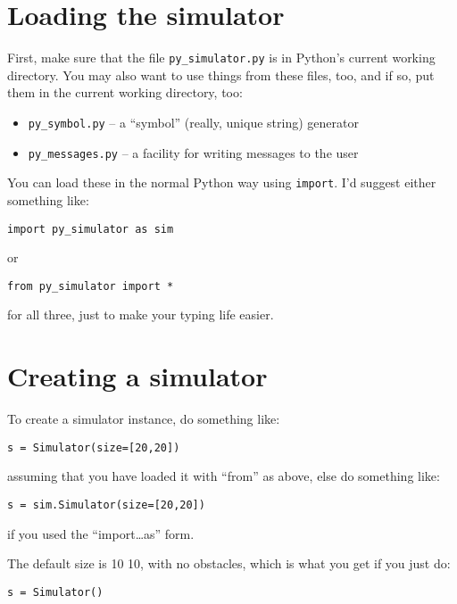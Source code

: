 \documentclass[11pt]{tufte-handout}
\begin{document}

\section{Loading the simulator}
\label{sec:orgf118c0c}

First, make sure that the file \texttt{py\_simulator.py} is in Python's current working directory.  You may also want to use things from these files, too, and if so, put them in the current working directory, too:
\begin{itemize}
\item \texttt{py\_symbol.py} -- a ``symbol'' (really, unique string) generator
\item \texttt{py\_messages.py} -- a facility for writing messages to the user
\end{itemize}

You can load these in the normal Python way using \texttt{import}.  I'd suggest either something like:
\begin{verbatim}
import py_simulator as sim
\end{verbatim}

or
\begin{verbatim}
from py_simulator import *
\end{verbatim}

\noindent for all three, just to make your typing life easier.

\section{Creating a simulator}
\label{sec:org8ddd231}

To create a simulator instance, do something like:
\begin{verbatim}
s = Simulator(size=[20,20])
\end{verbatim}

\noindent assuming that you have loaded it with ``from'' as above, else do something like:
\begin{verbatim}
s = sim.Simulator(size=[20,20])
\end{verbatim}

\noindent if you used the ``import\ldots{}as'' form.

The default size is 10\texttimes{} 10, with no obstacles, which is what you get if you just do:
\begin{verbatim}
s = Simulator()
\end{verbatim}
\end{document}
